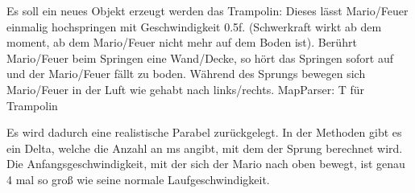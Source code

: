 Es soll ein neues Objekt erzeugt werden das Trampolin: 
	Dieses lässt Mario/Feuer einmalig hochspringen mit Geschwindigkeit 0.5f. (Schwerkraft wirkt ab dem moment, ab dem Mario/Feuer nicht mehr auf dem Boden ist). Berührt Mario/Feuer beim Springen eine Wand/Decke, so hört das Springen sofort auf und der Mario/Feuer fällt zu boden.
	Während des Sprungs bewegen sich Mario/Feuer in der Luft wie gehabt nach links/rechts.
	MapParser: T für Trampolin


Es wird dadurch eine realistische Parabel zurückgelegt. In der Methoden gibt es ein Delta, welche die Anzahl an ms angibt, mit dem der Sprung berechnet wird.
Die Anfangsgeschwindigkeit, mit der sich der Mario nach oben bewegt, ist genau 4 mal so groß wie seine normale Laufgeschwindigkeit.